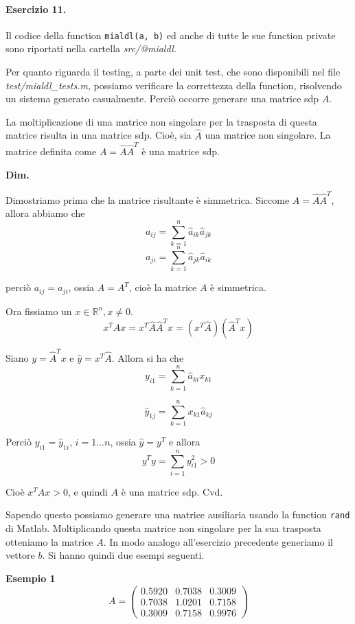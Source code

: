 \paragraph{Esercizio 11.} Il codice della function \verb|mialdl(a, b)| ed anche di tutte le sue function private sono riportati nella cartella \emph{src/@mialdl}.

Per quanto riguarda il testing, a parte dei unit test, che sono disponibili nel file \emph{test/mialdl\_tests.m}, possiamo verificare la correttezza della function, risolvendo un sistema generato casualmente. Perciò occorre generare una matrice sdp $A$.

La moltiplicazione di una matrice non singolare per la trasposta di questa matrice risulta in una matrice sdp. Cioè, sia $\hat{A}$ una matrice non singolare. La matrice definita come $A = \hat{A} \hat{A}^T$ è una matrice sdp.

\textbf{Dim.}

Dimostriamo prima che la matrice risultante è simmetrica. Siccome $A = \hat{A} \hat{A}^T$, allora abbiamo che
\[
a_{ij} = \sum_{k=1}^{n} \hat{a}_{ik} \hat{a}_{jk}
\]
\[
a_{ji} = \sum_{k=1}^{n} \hat{a}_{jk} \hat{a}_{ik}
\]

perciò $a_{ij} = a_{ji}$, ossia $A = A^T$, cioè la matrice $A$ è simmetrica.

Ora fissiamo un $x \in \mathbb{R}^n, x \neq 0$.
\[
x^T A x = x^T \hat{A} \hat{A}^T x = (x^T \hat{A}) (\hat{A}^T x)
\]

Siano $y = \hat{A}^T x$ e $\hat{y} = x^T \hat{A}$. Allora si ha che
\[
y_{i1} = \sum_{k=1}^{n} \hat{a}_{ki} x_{k1}
\]

\[
\hat{y}_{1j} = \sum_{k=1}^{n} x_{k1} \hat{a}_{kj}
\]

Perciò $y_{i1} = \hat{y}_{1i}$, $i = 1 \dots n$, ossia $\hat{y} = y^T$ e allora
\[
y^T y = \sum_{i=1}^{n} y_{i1}^2 > 0
\]

Cioè $x^T A x > 0$, e quindi $A$ è una matrice sdp. Cvd.

Sapendo questo possiamo generare una matrice ausiliaria usando la function \verb|rand| di Matlab. Moltiplicando questa matrice non singolare per la sua trasposta otteniamo la matrice $A$. In modo analogo all'esercizio precedente generiamo il vettore $b$. Si hanno quindi due esempi seguenti.

\textbf{Esempio 1}
\[
A = \begin{pmatrix}
0.5920 & 0.7038 & 0.3009\\
0.7038 & 1.0201 & 0.7158\\
0.3009 & 0.7158 & 0.9976
\end{pmatrix}
\]

